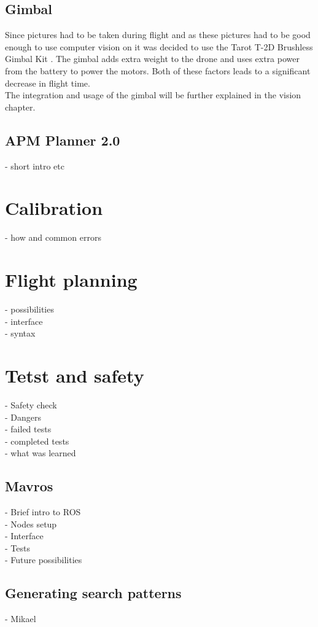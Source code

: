 \subsection{Gimbal}
Since pictures had to be taken during flight and as these pictures had to be good enough to use computer vision on it was decided to use the Tarot T-2D Brushless Gimbal Kit \cite{Ref:Gimbal}. The gimbal adds extra weight to the drone and uses extra power from the battery to power the motors. Both of these factors leads to a significant decrease in flight time.\\
The integration and usage of the gimbal will be further explained in the vision chapter. 
\subsection{APM Planner 2.0}
- short intro etc \\

\section{Calibration}
- how and common errors\\
\section{Flight planning}
- possibilities\\
- interface\\
- syntax\\
\section{Tetst and safety}
- Safety check\\
- Dangers\\
- failed tests\\
- completed tests\\
- what was learned\\

\subsection{Mavros}
- Brief intro to ROS\\
- Nodes setup\\
- Interface\\
- Tests\\
- Future possibilities\\
\subsection{Generating search patterns}
- Mikael\\
\newpage